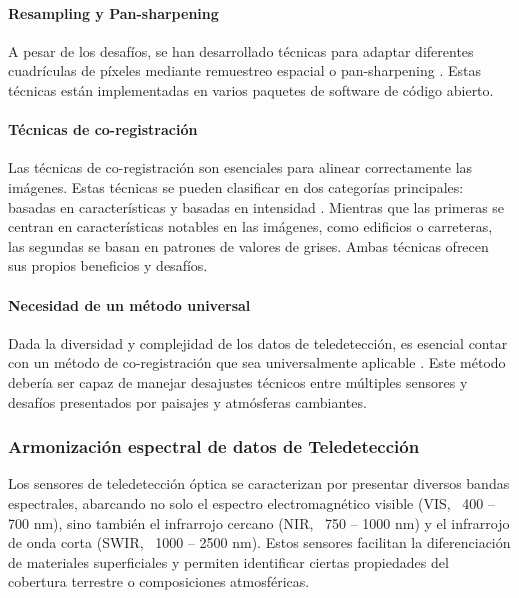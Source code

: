                 \paragraph{Resampling y Pan-sharpening}
                    A pesar de los desafíos, se han desarrollado técnicas para adaptar diferentes cuadrículas de píxeles mediante remuestreo espacial o pan-sharpening \autocite{ghassemian2016review, javan2021review, li2017pixel}. Estas técnicas están implementadas en varios paquetes de software de código abierto.
                    
                \paragraph{Técnicas de co-registración}
                    Las técnicas de co-registración son esenciales para alinear correctamente las imágenes. Estas técnicas se pueden clasificar en dos categorías principales: basadas en características y basadas en intensidad \autocite{zitova2003image}. Mientras que las primeras se centran en características notables en las imágenes, como edificios o carreteras, las segundas se basan en patrones de valores de grises. Ambas técnicas ofrecen sus propios beneficios y desafíos. 
                    
                \paragraph{Necesidad de un método universal}
                    Dada la diversidad y complejidad de los datos de teledetección, es esencial contar con un método de co-registración que sea universalmente aplicable \autocite{chen2003mutual}. Este método debería ser capaz de manejar desajustes técnicos entre múltiples sensores y desafíos presentados por paisajes y atmósferas cambiantes.

            \subsubsection{Armonización espectral de datos de Teledetección}
                Los sensores de teledetección óptica se caracterizan por presentar diversos bandas espectrales, abarcando no solo el espectro electromagnético visible (VIS, ~400 – 700 nm), sino también el infrarrojo cercano (NIR, ~750 – 1000 nm) y el infrarrojo de onda corta (SWIR, ~1000 – 2500 nm). Estos sensores facilitan la diferenciación de materiales superficiales y permiten identificar ciertas propiedades del cobertura terrestre o composiciones atmosféricas.
                

